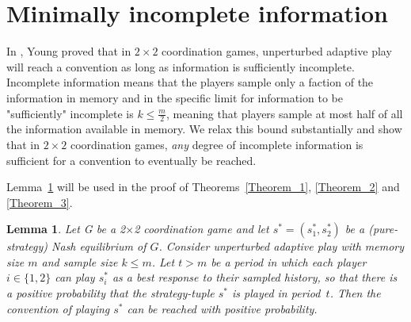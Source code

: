 \documentclass[11.5pt]{article}
\newtheorem{lemma}{Lemma}
\begin{document}
%
%
%
%
%
%
%



\section{Minimally incomplete information} 



In \cite{Young1998}, Young proved that in $2\times 2$ coordination games, unperturbed adaptive play will reach a convention as long as information is sufficiently incomplete. Incomplete information means that the players sample only a faction of the information in memory and in \cite{Young1998} the specific limit for information to be "sufficiently" incomplete is $k \leq \frac{m}{2}$, meaning that players sample at most half of all the information available in memory. 
We relax this bound substantially and show that in $2\times 2$ coordination games, {\emph {any} }degree of incomplete information is sufficient for a convention to eventually be reached.





Lemma~\ref{Lemma_1} will be used in the proof of Theorems~\ref{Theorem_1}, \ref{Theorem_2} and \ref{Theorem_3}.

\vskip12pt




\begin{lemma}\label{Lemma_1} Let G be a 2$\times$2 coordination game and let $s^* = (s^*_1, s^*_2)$ be a (pure-strategy) Nash equilibrium of $G$. Consider unperturbed adaptive play with memory size $m$ and sample size $k\leq m$. Let $t > m$ be a period in which each player~$i\in\{1,2\}$ can play $s^*_i$ as a best response to their sampled history, so that there is a positive probability that the strategy-tuple $s^*$ is played in period~$t$. Then the convention of playing $s^*$ can be reached with positive probability.
\end{lemma}
\end{document}
